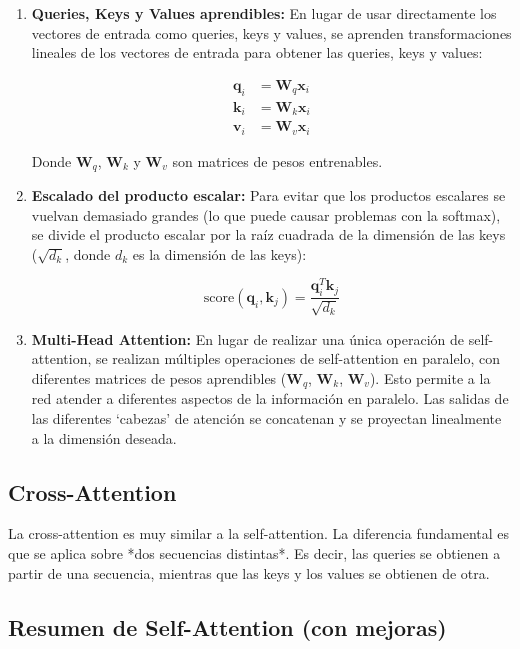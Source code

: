 \documentclass{article}
\begin{document}
\begin{enumerate}
    \item \textbf{Queries, Keys y Values aprendibles:}  En lugar de usar directamente los vectores de entrada como queries, keys y values, se aprenden transformaciones lineales de los vectores de entrada para obtener las queries, keys y values:

    \begin{align*}
    \mathbf{q}_i &= \mathbf{W}_q \mathbf{x}_i \\
    \mathbf{k}_i &= \mathbf{W}_k \mathbf{x}_i \\
    \mathbf{v}_i &= \mathbf{W}_v \mathbf{x}_i
    \end{align*}

    Donde \(\mathbf{W}_q\), \(\mathbf{W}_k\) y \(\mathbf{W}_v\) son matrices de pesos entrenables.

    \item \textbf{Escalado del producto escalar:}  Para evitar que los productos escalares se vuelvan demasiado grandes (lo que puede causar problemas con la softmax), se divide el producto escalar por la raíz cuadrada de la dimensión de las keys (\(\sqrt{d_k}\), donde \(d_k\) es la dimensión de las keys):

    \[
    \text{score}(\mathbf{q}_i, \mathbf{k}_j) = \frac{\mathbf{q}_i^T \mathbf{k}_j}{\sqrt{d_k}}
    \]

    \item \textbf{Multi-Head Attention:}  En lugar de realizar una única operación de self-attention, se realizan múltiples operaciones de self-attention en paralelo, con diferentes matrices de pesos aprendibles (\(\mathbf{W}_q\), \(\mathbf{W}_k\), \(\mathbf{W}_v\)).  Esto permite a la red atender a diferentes aspectos de la información en paralelo.  Las salidas de las diferentes `cabezas' de atención se concatenan y se proyectan linealmente a la dimensión deseada.

\end{enumerate}

\subsection{Cross-Attention}
La cross-attention es muy similar a la self-attention. La diferencia fundamental es que se aplica sobre *dos secuencias distintas*. Es decir, las queries se obtienen a partir de una secuencia, mientras que las keys y los values se obtienen de otra.

\subsection{Resumen de Self-Attention (con mejoras)}
\end{document}
